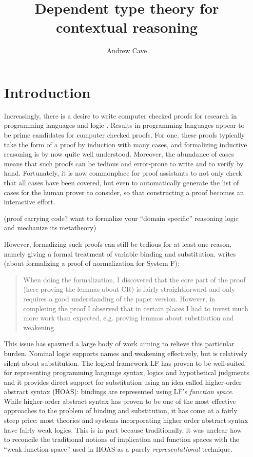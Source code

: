\documentclass{article}
\author{Andrew Cave}
\title{Dependent type theory for contextual reasoning}
\newcommand{\LONGVERSION}[1]{{\color{light-gray}#1}}
\begin{document}
\maketitle

\section{Introduction}


Increasingly, there is a desire to write computer checked proofs for
research in programming languages and logic
\citep{POPLMark}. Results in programming languages appear to be prime
candidates for computer checked proofs. For one, these proofs typically take the
form of a proof by induction with many cases, and formalizing inductive
reasoning is by now quite well understood. Moreover, the abundance of cases means that such proofs can be
tedious and error-prone to write and to verify by hand. Fortunately, it is now commonplace for proof
assistants to not only check that all cases have been covered, but
even to automatically generate the list of cases for the human prover
to consider, so that constructing a proof becomes an interactive
effort.

\LONGVERSION{(proof carrying code? want to formalize your ``domain specific'' reasoning logic and mechanize
its metatheory)}

However, formalizing such proofs can still be tedious for at least one reason,
namely giving a formal treatment of variable binding and
substitution. \cite{Altenkirch93} writes (about
formalizing a proof of normalization for System F):

\begin{quote}
When doing the formalization, I discovered that the core part of the
proof (here proving the lemmas about CR) is fairly straightforward and
only requires a good understanding of the paper version. However, in
completing the proof I observed that in certain places I had to invest
much more work than expected, e.g. proving lemmas about substitution
and weakening.
\end{quote}

This issue has spawned a large body of work aiming to relieve this
particular burden. Nominal logic \cite{?} supports names and weakening
effectively, but is relatively silent about substitution. The
logical framework LF \citep{Harper93jacm} has proven to be well-suited
for representing programming language syntax, logics and hypothetical
judgments and it provides direct support for substitution using an
idea called higher-order abstract syntax (HOAS): bindings are
represented using LF's \emph{function space}. While higher-order
abstract syntax has proven to be one of the most 
effective approaches to the problem of binding and substitution, it
has come at a fairly steep price: most theories and systems
incorporating higher order abstract syntax have fairly weak
logics. This is in part because traditionally, it was unclear how to
reconcile the traditional notions of implication and function spaces with
the ``weak function space'' used in HOAS as a purely \emph{representational} technique.
\end{document}
